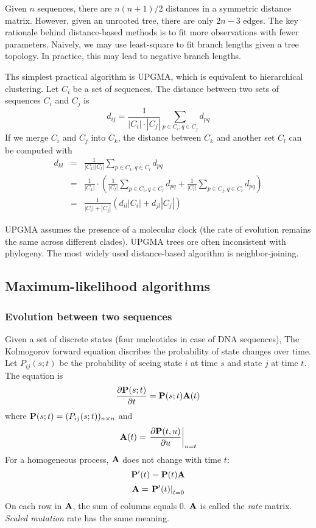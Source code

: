 \documentclass[10pt]{article}
\begin{document}
Given $n$ sequences, there are $n(n+1)/2$ distances in a symmetric distance
matrix. However, given an unrooted tree, there are only $2n-3$ edges. The key
rationale behind distance-based methods is to fit more observations with fewer
parameters. Naively, we may use least-square to fit branch lengths given a tree
topology. In practice, this may lead to negative branch lengths.

Ths simplest practical algorithm is UPGMA, which is equivalent to hierarchical
clustering.  Let $C_i$ be a set of sequences. The distance between two sets of
sequences $C_i$ and $C_j$ is
$$
d_{ij}=\frac{1}{|C_i|\cdot|C_j|}\sum_{p\in C_i,q\in C_j}d_{pq}
$$
If we merge $C_i$ and $C_j$ into $C_k$, the distance between $C_k$ and another
set $C_l$ can be computed with
\begin{eqnarray*}
d_{kl}&=&\frac{1}{|C_k||C_l|}\sum_{p\in C_k,q\in C_l}d_{pq}\\
&=&\frac{1}{|C_k|}\cdot\left(\frac{1}{|C_l|}\sum_{p\in C_i,q\in C_l}d_{pq}+\frac{1}{|C_l|}\sum_{p\in C_j,q\in C_l}d_{pq}\right)\\
&=&\frac{1}{|C_i|+|C_j|}\left(d_{il}|C_i|+d_{jl}|C_j|\right)
\end{eqnarray*}

UPGMA assumes the presence of a molecular clock (the rate of evolution remains
the same across different clades). UPGMA trees ore often inconsistent with
phylogeny. The most widely used distance-based algorithm is neighbor-joining.

\subsection{Maximum-likelihood algorithms}

\subsubsection{Evolution between two sequences}

Given a set of discrete states (four nucleotides in case of DNA sequences),
The Kolmogorov forward equation discribes the probability of state changes over
time. Let $P_{ij}(s;t)$ be the probability of seeing state $i$ at time $s$ and
state $j$ at time $t$. The equation is
\[
\frac{\partial {\bf P}(s;t)}{\partial t}={\bf P}(s;t){\bf A}(t)
\]
where ${\bf P}(s;t)=(P_{ij}(s;t))_{n\times n}$ and
\[
{\bf A}(t)=\left.\frac{\partial {\bf P}(t,u)}{\partial u}\right|_{u=t}
\]
For a homogeneous process, ${\bf A}$ does not change with time $t$:
\[
{\bf P}'(t)={\bf P}(t){\bf A}
\]
\[
{\bf A}=\left.{\bf P}'(t)\right|_{t=0}
\]
On each row in ${\bf A}$, the sum of columns equals 0. ${\bf A}$ is called the
\emph{rate} matrix. \emph{Scaled mutation} rate has the same meaning.
\end{document}

